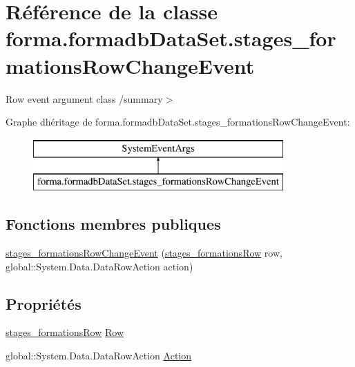 \hypertarget{classforma_1_1formadb_data_set_1_1stages__formations_row_change_event}{}\section{Référence de la classe forma.\+formadb\+Data\+Set.\+stages\+\_\+formations\+Row\+Change\+Event}
\label{classforma_1_1formadb_data_set_1_1stages__formations_row_change_event}


Row event argument class /summary$>$  


Graphe d\textquotesingle{}héritage de forma.\+formadb\+Data\+Set.\+stages\+\_\+formations\+Row\+Change\+Event\+:\begin{figure}[H]
\begin{center}
\leavevmode
\includegraphics[height=2.000000cm]{classforma_1_1formadb_data_set_1_1stages__formations_row_change_event}
\end{center}
\end{figure}
\subsection*{Fonctions membres publiques}
\begin{DoxyCompactItemize}
\item 
\hyperlink{classforma_1_1formadb_data_set_1_1stages__formations_row_change_event_aa47a1a832668aca93e8cb16591dd81e9}{stages\+\_\+formations\+Row\+Change\+Event} (\hyperlink{classforma_1_1formadb_data_set_1_1stages__formations_row}{stages\+\_\+formations\+Row} row, global\+::\+System.\+Data.\+Data\+Row\+Action action)
\end{DoxyCompactItemize}
\subsection*{Propriétés}
\begin{DoxyCompactItemize}
\item 
\hyperlink{classforma_1_1formadb_data_set_1_1stages__formations_row}{stages\+\_\+formations\+Row} \hyperlink{classforma_1_1formadb_data_set_1_1stages__formations_row_change_event_ad1f4185d33dae5fd357603be0bb596a6}{Row}
\item 
global\+::\+System.\+Data.\+Data\+Row\+Action \hyperlink{classforma_1_1formadb_data_set_1_1stages__formations_row_change_event_aef4417b06c8e367de92656179d503d87}{Action}
\end{DoxyCompactItemize}


